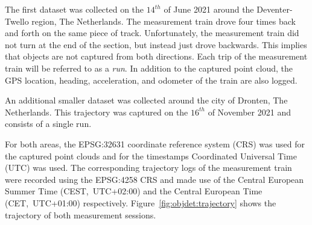 The first dataset was collected on the $14^{th}$ of June 2021 around the Deventer-Twello region, The Netherlands. The  measurement train drove four times back and forth on the same piece of track. Unfortunately, the measurement train did not turn at the end of the section, but instead just drove backwards. This implies that objects are not captured from both directions. Each trip of the measurement train will be referred to as a \emph{run}. In addition to the captured point cloud, the GPS location, heading, acceleration, and odometer of the train are also logged. 

An additional smaller dataset was collected around the city of Dronten, The Netherlands. This trajectory was captured on the $16^{th}$ of November 2021 and consists of a single run.

For both areas, the EPSG:32631 coordinate reference system (CRS) was used for the captured point clouds and for the timestamps Coordinated Universal Time (UTC) was used. The corresponding trajectory logs of the measurement train were recorded using the EPSG:4258 CRS and made use of the Central European Summer Time (CEST,~UTC+02:00) and the Central European Time (CET,~UTC+01:00) respectively. Figure~\ref{fig:objdet:trajectory} shows the trajectory of both measurement sessions.

